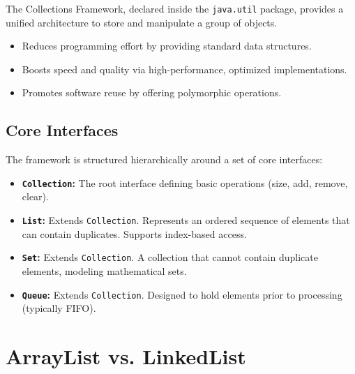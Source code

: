 \documentclass[12pt,a4paper]{article}
\begin{document}
The Collections Framework, declared inside the \texttt{java.util} package, provides a unified architecture to store and manipulate a group of objects.

\begin{tcolorbox}[defbox, title={\textbf{Core Design Benefits}}]
\begin{itemize}[leftmargin=*, itemsep=3pt]
  \item Reduces programming effort by providing standard data structures.
  \item Boosts speed and quality via high-performance, optimized implementations.
  \item Promotes software reuse by offering polymorphic operations.
\end{itemize}
\end{tcolorbox}

\subsection{Core Interfaces}
The framework is structured hierarchically around a set of core interfaces:
\begin{itemize}[leftmargin=*, itemsep=4pt]
  \item \textbf{\texttt{Collection}:} The root interface defining basic operations (size, add, remove, clear).
  \item \textbf{\texttt{List}:} Extends \texttt{Collection}. Represents an ordered sequence of elements that can contain duplicates. Supports index-based access.
  \item \textbf{\texttt{Set}:} Extends \texttt{Collection}. A collection that cannot contain duplicate elements, modeling mathematical sets.
  \item \textbf{\texttt{Queue}:} Extends \texttt{Collection}. Designed to hold elements prior to processing (typically FIFO).
\end{itemize}

\section{ArrayList vs. LinkedList}
\end{document}
